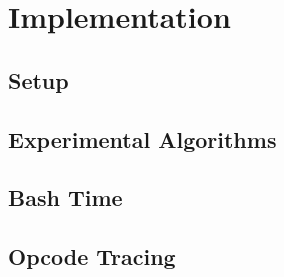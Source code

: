 \chapter{Implementation}\label{ch:implementation}

\section{Setup}\label{sec:setup}


\section{Experimental Algorithms}\label{sec:experimental-algorithms}



\section{Bash Time}\label{sec:bash-time}


\section{Opcode Tracing}\label{sec:opcode-tracing}
